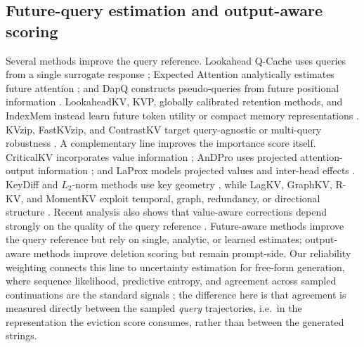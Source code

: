 \documentclass{article} %
\begin{document}
\subsection{Future-query estimation and output-aware scoring} \label{subsec:rw_future}
Several methods improve the query reference. Lookahead Q-Cache uses queries from a single surrogate response \citep{wang2025lookahead}; Expected Attention analytically estimates future attention \citep{devoto2025expected}; and DapQ constructs pseudo-queries from future positional information \citep{tian2026dapq}. LookaheadKV, KVP, globally calibrated retention methods, and IndexMem instead learn future token utility or compact memory representations \citep{ahn2026lookaheadkv,moschella2026learning,bui2026make,yang2026indexmem}. KVzip, FastKVzip, and ContrastKV target query-agnostic or multi-query robustness \citep{kim2026fastkvzip,kim2026kvzip,chen2026contrastkv}. A complementary line improves the importance score itself. CriticalKV incorporates value information \citep{guo2024criticalkv}; AnDPro uses projected attention-output information \citep{geng2026accurate}; and LaProx models projected values and inter-head effects \citep{mai2026laprox}. KeyDiff and $L_2$-norm methods use key geometry \citep{park2026keydiff,devoto2024simple}, while LagKV, GraphKV, R-KV, and MomentKV exploit temporal, graph, redundancy, or directional structure \citep{liang2025lagkv,li2025graphkv,cai2025rkv,li2026momentkv}. Recent analysis also shows that value-aware corrections depend strongly on the quality of the query reference \citep{zhang2026valueaware}. Future-aware methods improve the query reference but rely on single, analytic, or learned estimates; output-aware methods improve deletion scoring but remain prompt-side. Our reliability weighting connects this line to uncertainty estimation for free-form generation, where sequence likelihood, predictive entropy, and agreement across sampled continuations are the standard signals \citep{kuhn2023semantic,farquhar2024detecting}; the difference here is that agreement is measured directly between the sampled \emph{query} trajectories, i.e.\ in the representation the eviction score consumes, rather than between the generated strings.
\end{document}
